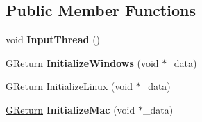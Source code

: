 \subsection*{Public Member Functions}
\begin{DoxyCompactItemize}
\item 
void {\bfseries Input\+Thread} ()\hypertarget{classInput_a373c67d7fd7e2b81a0f498afb201b124}{}\label{classInput_a373c67d7fd7e2b81a0f498afb201b124}

\item 
\hyperlink{namespaceGW_a67a839e3df7ea8a5c5686613a7a3de21}{G\+Return} {\bfseries Initialize\+Windows} (void $\ast$\+\_\+data)\hypertarget{classInput_a180c021bb7e2e2a77325027f1e79d7fe}{}\label{classInput_a180c021bb7e2e2a77325027f1e79d7fe}

\item 
\hyperlink{namespaceGW_a67a839e3df7ea8a5c5686613a7a3de21}{G\+Return} \hyperlink{classInput_a1d195bdfcab3c160f99b1010face1e61}{Initialize\+Linux} (void $\ast$\+\_\+data)
\item 
\hyperlink{namespaceGW_a67a839e3df7ea8a5c5686613a7a3de21}{G\+Return} {\bfseries Initialize\+Mac} (void $\ast$\+\_\+data)\hypertarget{classInput_ad83dda6b9dd9388be971ff580451cfb9}{}\label{classInput_ad83dda6b9dd9388be971ff580451cfb9}


\end{DoxyCompactItemize}
